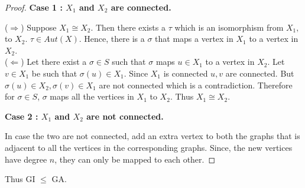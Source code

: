 \begin{proof}
\textbf{Case 1 : $X_1$ and $X_2$ are connected.}

($\Rightarrow$) Suppose $X_1 \cong X_2$. Then there exists a $\tau$ which is an isomorphism from $X_1,$ to $X_2$. $\tau \in Aut(X)$. Hence, there is a $\sigma$ that maps a vertex in $X_1$ to a vertex in $X_2$.\\

($\Leftarrow$) Let there exist a $\sigma\in S$ such that $\sigma$ maps $u \in X_1$ to a vertex in $X_2$. Let $v \in X_1$ be such that $\sigma(u) \in X_1$. Since $X_1$ is connected $u,v$ are connected. But $\sigma(u) \in X_2, \sigma(v) \in X_1$ are not connected which is a contradiction. Therefore for $\sigma\in S$, $\sigma$ maps all the vertices in $X_1$ to $X_2$. Thus $X_1 \cong X_2$.

\textbf{Case 2 : $X_1$ and $X_2$ are not connected.}

In case the two are not connected, add an extra vertex to both the graphs that is adjacent to all the vertices in the corresponding graphs. Since, the new vertices have degree $n$, they can only be mapped to each other.
\end{proof}

Thus GI $\le$ GA.



